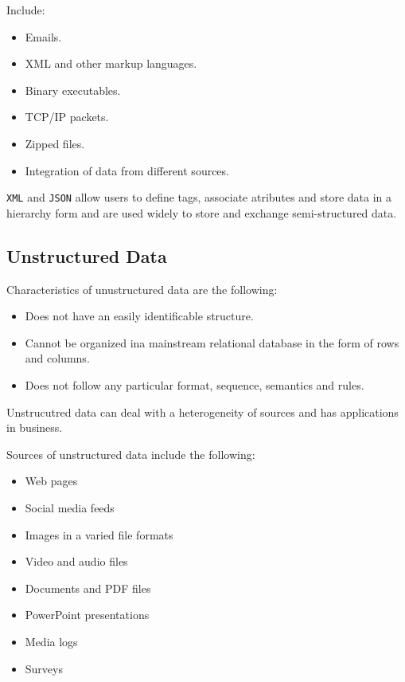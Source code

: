 \documentclass[../../ibm_data_analysis.tex]{subfiles}
\begin{document}
    \begin{exa}
        Include:
        \begin{itemize}
            \item Emails.
            \item XML and other markup languages.
            \item Binary executables.
            \item TCP/IP packets.
            \item Zipped files.
            \item Integration of data from different sources.
        \end{itemize}
    \end{exa}

    \begin{obs}
        \lstinline|XML| and \lstinline|JSON| allow users to define tags, associate atributes and store data in a hierarchy form and are used widely to store and exchange semi-structured data.
    \end{obs}

    \subsection{Unstructured Data}

    Characteristics of unustructured data are the following:
    \begin{itemize}
        \item Does not have an easily identificable structure.
        \item Cannot be organized ina  mainstream relational database in the form of rows and columns.
        \item Does not follow any particular format, sequence, semantics and rules.
    \end{itemize}
    Unstrucutred data can deal with a heterogeneity of sources and has applications in business.

    \begin{exa}
        Sources of unstructured data include the following:
        \begin{itemize}
            \item Web pages
            \item Social media feeds
            \item Images in a varied file formats
            \item Video and audio files
            \item Documents and PDF files
            \item PowerPoint presentations
            \item Media logs
            \item Surveys
        \end{itemize}
    \end{exa}
\end{document}
